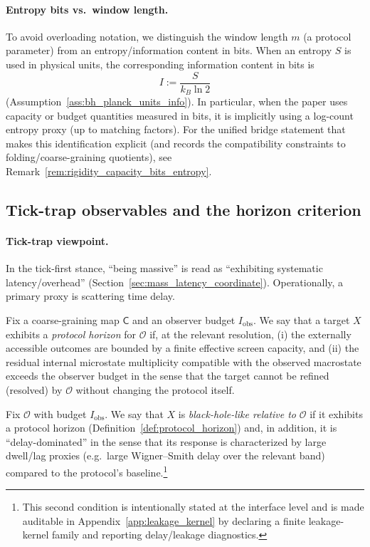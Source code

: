 \paragraph{Entropy bits vs.\ window length.}
\AuditTag To avoid overloading notation, we distinguish the window length $m$ (a protocol parameter) from an entropy/information content in bits.
When an entropy $S$ is used in physical units, the corresponding information content in bits is
\[
I:=\frac{S}{k_B\ln 2}
\]
(Assumption~\ref{ass:bh_planck_units_info}).
\AuditTag In particular, when the paper uses capacity or budget quantities measured in bits, it is implicitly using a log-count entropy proxy (up to matching factors).
For the unified bridge statement that makes this identification explicit (and records the compatibility constraints to folding/coarse-graining quotients), see Remark~\ref{rem:rigidity_capacity_bits_entropy}.

\subsection{Tick-trap observables and the horizon criterion}
\label{subsec:protocol_horizon_criterion}

\paragraph{Tick-trap viewpoint.}
\InterfaceTag In the tick-first stance, ``being massive'' is read as ``exhibiting systematic latency/overhead'' (Section~\ref{sec:mass_latency_coordinate}).
Operationally, a primary proxy is scattering time delay.

\begin{definition}
\label{def:protocol_horizon}
Fix a coarse-graining map $\mathsf C$ and an observer budget $I_{\mathrm{obs}}$.
We say that a target $X$ exhibits a \emph{protocol horizon} for $\mathcal O$ if, at the relevant resolution, (i) the externally accessible outcomes are bounded by a finite effective screen capacity, and (ii) the residual internal microstate multiplicity compatible with the observed macrostate exceeds the observer budget in the sense that the target cannot be refined (resolved) by $\mathcal O$ without changing the protocol itself.
\end{definition}

\begin{definition}
\label{def:relative_black_hole_protocol}
Fix $\mathcal O$ with budget $I_{\mathrm{obs}}$.
We say that $X$ is \emph{black-hole-like relative to} $\mathcal O$ if it exhibits a protocol horizon (Definition~\ref{def:protocol_horizon}) and, in addition, it is ``delay-dominated'' in the sense that its response is characterized by large dwell/lag proxies (e.g.\ large Wigner--Smith delay over the relevant band) compared to the protocol's baseline.\footnote{This second condition is intentionally stated at the interface level and is made auditable in Appendix~\ref{app:leakage_kernel} by declaring a finite leakage-kernel family and reporting delay/leakage diagnostics.}
\end{definition}

